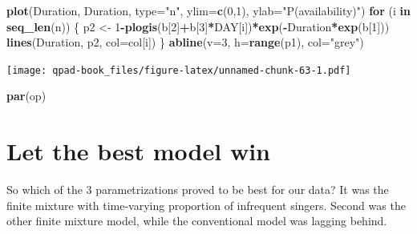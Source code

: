 \documentclass[12pt,]{book}
\newenvironment{Shaded}{\begin{snugshade}}{\end{snugshade}}
\newcommand{\ControlFlowTok}[1]{\textcolor[rgb]{0.13,0.29,0.53}{\textbf{#1}}}
\newcommand{\DataTypeTok}[1]{\textcolor[rgb]{0.13,0.29,0.53}{#1}}
\newcommand{\DecValTok}[1]{\textcolor[rgb]{0.00,0.00,0.81}{#1}}
\newcommand{\KeywordTok}[1]{\textcolor[rgb]{0.13,0.29,0.53}{\textbf{#1}}}
\newcommand{\NormalTok}[1]{#1}
\newcommand{\OperatorTok}[1]{\textcolor[rgb]{0.81,0.36,0.00}{\textbf{#1}}}
\newcommand{\StringTok}[1]{\textcolor[rgb]{0.31,0.60,0.02}{#1}}
\begin{document}
\begin{Shaded}
\begin{Highlighting}[]
\KeywordTok{plot}\NormalTok{(Duration, Duration, }\DataTypeTok{type=}\StringTok{"n"}\NormalTok{, }\DataTypeTok{ylim=}\KeywordTok{c}\NormalTok{(}\DecValTok{0}\NormalTok{,}\DecValTok{1}\NormalTok{),}
    \DataTypeTok{ylab=}\StringTok{"P(availability)"}\NormalTok{)}
\ControlFlowTok{for}\NormalTok{ (i }\ControlFlowTok{in} \KeywordTok{seq_len}\NormalTok{(n)) \{}
\NormalTok{    p2 <-}\StringTok{ }\DecValTok{1}\OperatorTok{-}\KeywordTok{plogis}\NormalTok{(b[}\DecValTok{2}\NormalTok{]}\OperatorTok{+}\NormalTok{b[}\DecValTok{3}\NormalTok{]}\OperatorTok{*}\NormalTok{DAY[i])}\OperatorTok{*}\KeywordTok{exp}\NormalTok{(}\OperatorTok{-}\NormalTok{Duration}\OperatorTok{*}\KeywordTok{exp}\NormalTok{(b[}\DecValTok{1}\NormalTok{]))}
    \KeywordTok{lines}\NormalTok{(Duration, p2, }\DataTypeTok{col=}\NormalTok{col[i])}
\NormalTok{\}}
\KeywordTok{abline}\NormalTok{(}\DataTypeTok{v=}\DecValTok{3}\NormalTok{, }\DataTypeTok{h=}\KeywordTok{range}\NormalTok{(p1), }\DataTypeTok{col=}\StringTok{"grey"}\NormalTok{)}
\end{Highlighting}
\end{Shaded}

\texttt{[image: qpad-book\_files/figure-latex/unnamed-chunk-63-1.pdf]}

\begin{Shaded}
\begin{Highlighting}[]
\KeywordTok{par}\NormalTok{(op)}
\end{Highlighting}
\end{Shaded}

\hypertarget{let-the-best-model-win}{%
\section{Let the best model win}\label{let-the-best-model-win}}

So which of the 3 parametrizations proved to be best for our data?
It was the finite mixture with time-varying proportion of infrequent singers.
Second was the other finite mixture model, while the conventional model
was lagging behind.

\begin{Shaded}
\end{Shaded}
\end{document}
